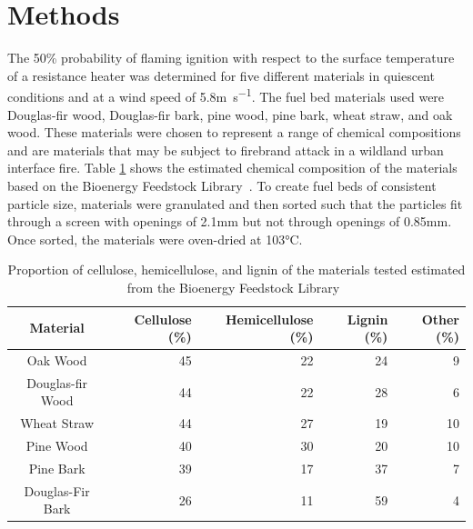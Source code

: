 \section{Methods}
\label{sec:methods3}
    The 50\% probability of flaming ignition with respect to the surface temperature of a resistance heater was determined for five different materials in quiescent conditions and at a wind speed of 5.8\si{\meter\per\second}. The fuel bed materials used were Douglas-fir wood, Douglas-fir bark, pine wood, pine bark, wheat straw, and oak wood. These materials were chosen to represent a range of chemical compositions and are materials that may be subject to firebrand attack in a wildland urban interface fire. Table \ref{tab:composition} shows the estimated chemical composition of the materials based on the Bioenergy Feedstock Library~\cite{feedstock}. To create fuel beds of consistent particle size,  materials were granulated and then sorted such that the particles fit through a screen with openings of 2.1\si{\milli\meter} but not through openings of 0.85\si{\milli\meter}. Once sorted, the materials were oven-dried at 103\si{\celsius}.
    \begin{table}[hpbt]
        \caption{Proportion of cellulose, hemicellulose, and lignin of the materials tested estimated from the Bioenergy Feedstock Library~\cite{feedstock}}
        \centering
        \begin{tabular}{crrrr}
            Material & Cellulose (\%) & Hemicellulose (\%) & Lignin (\%) & Other (\%) \\
            \hline
            Oak Wood         & 45 & 22 & 24 & 9\\
            Douglas-fir Wood & 44 & 22 & 28 & 6\\
            Wheat Straw      & 44 & 27 & 19 & 10\\
            Pine Wood        & 40 & 30 & 20 & 10\\
            Pine Bark        & 39 & 17 & 37 & 7\\
            Douglas-Fir Bark & 26 & 11 & 59 & 4 
        \end{tabular}
        \label{tab:composition}
    \end{table}
